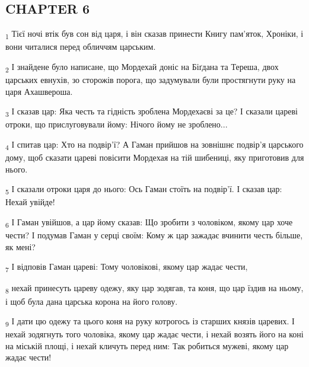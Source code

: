 \subsection{CHAPTER 6}
\begin{tcolorbox}
\textsubscript{1} Тієї ночі втік був сон від царя, і він сказав принести Книгу пам'яток, Хроніки, і вони читалися перед обличчям царським.
\end{tcolorbox}
\begin{tcolorbox}
\textsubscript{2} І знайдене було написане, що Мордехай доніс на Біґдана та Тереша, двох царських евнухів, зо сторожів порога, що задумували були простягнути руку на царя Ахашвероша.
\end{tcolorbox}
\begin{tcolorbox}
\textsubscript{3} І сказав цар: Яка честь та гідність зроблена Мордехаєві за це? І сказали цареві отроки, що прислуговували йому: Нічого йому не зроблено...
\end{tcolorbox}
\begin{tcolorbox}
\textsubscript{4} І спитав цар: Хто на подвір'ї? А Гаман прийшов на зовнішнє подвір'я царського дому, щоб сказати цареві повісити Мордехая на тій шибениці, яку приготовив для нього.
\end{tcolorbox}
\begin{tcolorbox}
\textsubscript{5} І сказали отроки царя до нього: Ось Гаман стоїть на подвір'ї. І сказав цар: Нехай увійде!
\end{tcolorbox}
\begin{tcolorbox}
\textsubscript{6} І Гаман увійшов, а цар йому сказав: Що зробити з чоловіком, якому цар хоче чести? І подумав Гаман у серці своїм: Кому ж цар зажадає вчинити честь більше, як мені?
\end{tcolorbox}
\begin{tcolorbox}
\textsubscript{7} І відповів Гаман цареві: Тому чоловікові, якому цар жадає чести,
\end{tcolorbox}
\begin{tcolorbox}
\textsubscript{8} нехай принесуть цареву одежу, яку цар зодягав, та коня, що цар їздив на ньому, і щоб була дана царська корона на його голову.
\end{tcolorbox}
\begin{tcolorbox}
\textsubscript{9} І дати цю одежу та цього коня на руку котрогось із старших князів царевих. І нехай зодягнуть того чоловіка, якому цар жадає чести, і нехай возять його на коні на міській площі, і нехай кличуть перед ним: Так робиться мужеві, якому цар жадає чести!
\end{tcolorbox}
